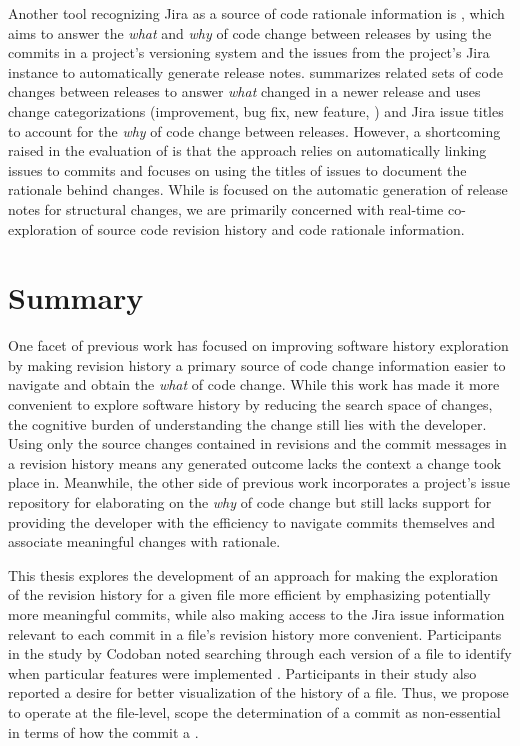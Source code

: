 Another tool recognizing Jira as a source of code rationale information is  \cite{moreno_arena_2017}, 
which aims to answer the \emph{what} and \emph{why} of code change between releases by 
using the commits in a project's versioning system and the issues from the project's Jira instance 
to automatically generate release notes. 
 summarizes related sets of code changes between releases to answer \emph{what} 
changed in a newer release and uses change categorizations (\eg improvement, bug fix, new feature, \etc) 
and Jira issue titles to account for the \emph{why} of code change between releases.
However, a shortcoming raised in the evaluation of  is that the approach 
relies on automatically linking issues to commits and focuses on 
using the titles of issues to document the rationale behind changes.
While  is focused on the automatic generation of release notes for structural changes,
we are primarily concerned with real-time co-exploration of source code revision history 
and code rationale information.


\section{Summary}

One facet of previous work has focused on improving software history exploration by making revision history 
a primary source of code change information easier to navigate and obtain the \emph{what} of code change.
While this work has made it more convenient to explore software history by reducing the search space of changes, 
the cognitive burden of understanding the change still lies with the developer.
Using only the source changes contained in revisions and the commit messages in a revision history 
means any generated outcome lacks the context a change took place in.
Meanwhile, the other side of previous work incorporates a project's issue repository for elaborating 
on the \emph{why} of code change but still lacks support for providing the developer with the efficiency to 
navigate commits themselves and associate meaningful changes with rationale.

This thesis explores the development of an approach for making the exploration of the revision history 
for a given file more efficient by emphasizing potentially more meaningful commits, while also making 
access to the Jira issue information relevant to each commit in a file's revision history more convenient.
Participants in the study by Codoban \etal noted searching through
each version of a file to identify when particular features were
implemented \cite{codoban_software_2015}. 
Participants in their study also reported a desire for 
better visualization of the history of a file.
Thus, we propose to operate at the file-level,  scope the determination of
a commit as non-essential in terms of how the commit  a .

\endinput

Any text after an \endinput is ignored.
You could put scraps here or things in progress.